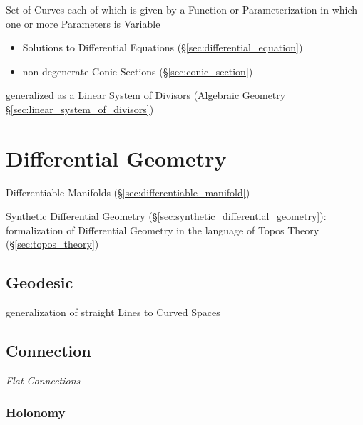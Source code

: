 Set of Curves each of which is given by a Function or Parameterization in which
one or more Parameters is Variable

\begin{itemize}
  \item Solutions to Differential Equations (\S\ref{sec:differential_equation})
  \item non-degenerate Conic Sections (\S\ref{sec:conic_section})
\end{itemize}

\fist generalized as a Linear System of Divisors (Algebraic Geometry
\S\ref{sec:linear_system_of_divisors})



\section{Differential Geometry}\label{sec:differential_geometry}

Differentiable Manifolds (\S\ref{sec:differentiable_manifold})

\fist Synthetic Differential Geometry
(\S\ref{sec:synthetic_differential_geometry}): formalization of Differential
Geometry in the language of Topos Theory (\S\ref{sec:topos_theory})



\subsection{Geodesic}\label{sec:geodesic}

generalization of straight Lines to Curved Spaces



\subsection{Connection}\label{sec:connection}

\emph{Flat Connections} %



\subsubsection{Holonomy}\label{sec:holonomy}

